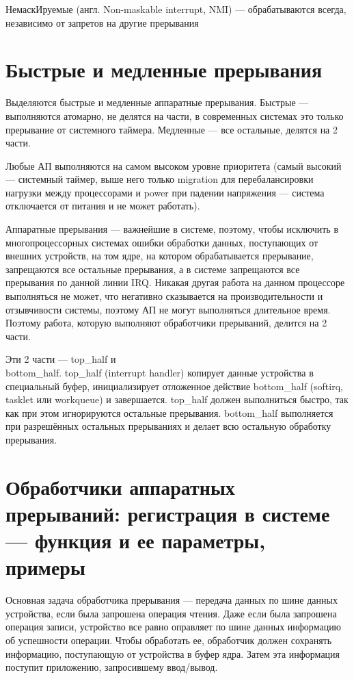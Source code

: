 НемаскИруемые (англ. Non-maskable interrupt, NMI) — обрабатываются всегда, независимо от запретов на другие прерывания

\section{Быстрые и медленные прерывания}

Выделяются быстрые и медленные аппаратные прерывания. Быстрые --- выполняются атомарно, не делятся на части, в современных системах это только прерывание от системного таймера. Медленные --- все остальные, делятся на 2 части.

Любые АП выполняются на самом высоком уровне приоритета (самый высокий --- системный таймер, выше него только migration для перебалансировки нагрузки между процессорами и power при падении напряжения --- система отключается от питания и не может работать).

Аппаратные прерывания --- важнейшие в системе, поэтому, чтобы исключить в многопроцессорных системах ошибки обработки данных, поступающих от внешних устройств, на том ядре, на котором обрабатывается прерывание, запрещаются все остальные прерывания, а в системе запрещаются все прерывания по данной линии IRQ. Никакая другая работа на данном процессоре выполняться не может, что негативно сказывается на производительности и отзывчивости системы, поэтому АП не могут выполняться длительное время. Поэтому работа, которую выполняют обработчики прерываний, делится на 2 части.

Эти 2 части --- top\_half и  \\ bottom\_half. top\_half (interrupt handler) копирует данные устройства в специальный буфер, инициализирует отложенное действие bottom\_half (softirq, tasklet или workqueue) и завершается. top\_half должен выполниться быстро, так как при этом игнорируются остальные прерывания. bottom\_half выполняется при разрешённых остальных прерываниях и делает всю остальную обработку прерывания.

\section{Обработчики аппаратных прерываний: регистрация в системе --- функция и ее параметры, примеры}

Основная задача обработчика прерывания --- передача данных по шине данных устройства, если была запрошена операция чтения. Даже если была запрошена операция записи, устройство все равно оправляет по шине данных информацию об успешности операции. Чтобы обработать ее, обработчик должен сохранять информацию, поступающую от устройства в буфер ядра. Затем эта информация поступит приложению, запросившему ввод/вывод.

